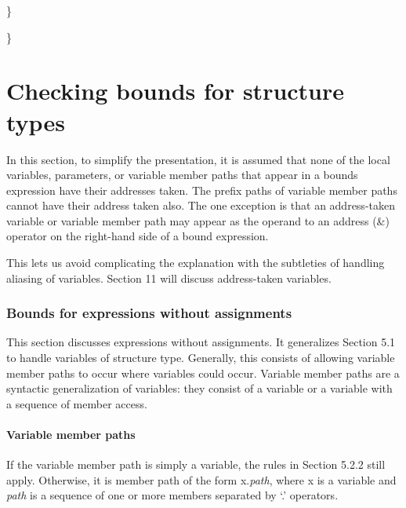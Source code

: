 \documentclass[]{article}
\let\oldparagraph\paragraph
\renewcommand{\paragraph}[1]{\oldparagraph{#1}\mbox{}}
\begin{document}
\}

\}

\section{Checking bounds for structure
types}\label{checking-bounds-for-structure-types}

In this section, to simplify the presentation, it is assumed that none
of the local variables, parameters, or variable member paths that appear
in a bounds expression have their addresses taken. The prefix paths of
variable member paths cannot have their address taken also. The one
exception is that an address-taken variable or variable member path may
appear as the operand to an address (\&) operator on the right-hand side
of a bound expression.

This lets us avoid complicating the explanation with the subtleties of
handling aliasing of variables. Section 11 will discuss address-taken
variables.

\subsubsection{\texorpdfstring{\protect\hypertarget{ux5fToc420589205}{}{\protect\hypertarget{ux5fToc422906996}{}{\protect\hypertarget{ux5fToc424307712}{}{\protect\hypertarget{ux5fRef424821946}{}{\protect\hypertarget{ux5fToc426641102}{}{\protect\hypertarget{ux5fToc435434984}{}{\protect\hypertarget{ux5fToc437460817}{}{\protect\hypertarget{ux5fToc440445498}{}{\protect\hypertarget{ux5fToc440449280}{}{\protect\hypertarget{ux5fToc440551930}{}{}}}}}}}}}}Bounds
for expressions without assignments
}{Bounds for expressions without assignments }}\label{bounds-for-expressions-without-assignments}

This section discusses expressions without assignments. It generalizes
Section 5.1 to handle variables of structure type. Generally, this
consists of allowing variable member paths to occur where variables
could occur. Variable member paths are a syntactic generalization of
variables: they consist of a variable or a variable with a sequence of
member access.

\paragraph{Variable member paths}\label{variable-member-paths}

If the variable member path is simply a variable, the rules in Section
5.2.2 still apply. Otherwise, it is member path of the form
x.\emph{path}, where x is a variable and \emph{path} is a sequence of
one or more members separated by `.' operators.
\end{document}

